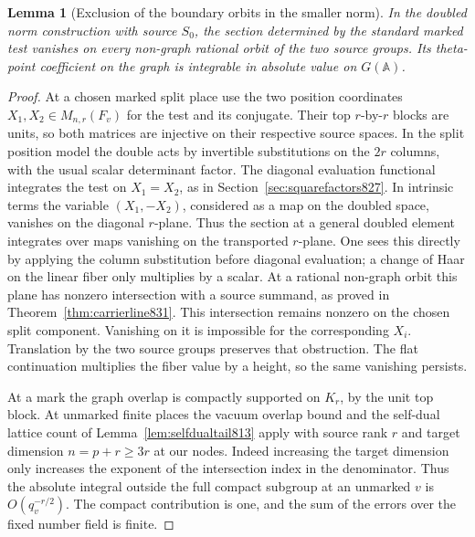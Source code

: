 \documentclass[a4paper,11pt]{article}
\newtheorem{lemma}[proposition]{Lemma}
\theoremstyle{definition}
\theoremstyle{remark}
\numberwithin{equation}{section}
\begin{document}
\begin{lemma}[Exclusion of the boundary orbits in the smaller norm]
\leavevmode\label{lem:nongraph840}
In the doubled norm construction with source \(S_0\), the
section determined by the standard marked test vanishes on
every non-graph rational orbit of the two source groups.
Its theta-point coefficient on the graph is integrable in
absolute value on \(G(\mathbb A)\).
\end{lemma}
\begin{proof}
At a chosen marked split place use the two position coordinates
\(X_1,X_2\in M_{n,r}(F_v)\) for the test and its conjugate.
Their top \(r\)-by-\(r\) blocks are units, so both matrices
are injective on their respective source spaces. In the split
position model the double acts by invertible substitutions
on the \(2r\) columns, with the usual scalar determinant
factor. The diagonal evaluation functional integrates the
test on \(X_1=X_2\), as in Section~\ref{sec:squarefactors827}.
In intrinsic terms the variable \((X_1,-X_2)\), considered
as a map on the doubled space, vanishes on the diagonal
\(r\)-plane. Thus the section at a general doubled element
integrates over maps vanishing on the transported \(r\)-plane.
One sees this directly by applying the column substitution
before diagonal evaluation; a change of Haar on the linear
fiber only multiplies by a scalar. At a rational non-graph
orbit this plane has nonzero intersection with a source
summand, as proved in Theorem~\ref{thm:carrierline831}.
This intersection remains nonzero on the chosen split
component. Vanishing on it is impossible for the corresponding
\(X_i\). Translation by the two source groups preserves that
obstruction. The flat continuation multiplies the fiber
value by a height, so the same vanishing persists.

At a mark the graph overlap is compactly supported on
\(K_r\), by the unit top block. At unmarked finite places the
vacuum overlap bound and the self-dual lattice count of
Lemma~\ref{lem:selfdualtail813} apply with source rank \(r\)
and target dimension \(n=p+r\ge3r\) at our nodes. Indeed
increasing the target dimension only increases the exponent
of the intersection index in the denominator. Thus the
absolute integral outside the full compact subgroup at an
unmarked \(v\) is \(O(q_v^{-r/2})\). The compact contribution
is one, and the sum of the errors over the fixed number
field is finite.


\end{proof}
\end{document}
